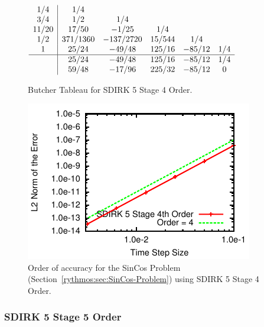 \begin{figure}[H]
\centering{}$\begin{array}{c|ccccc}
1/4 & 1/4\\
3/4 & 1/2 & 1/4\\
11/20 & 17/50 & -1/25 & 1/4\\
1/2 & 371/1360 & -137/2720 & 15/544 & 1/4\\
1 & 25/24 & -49/48 & 125/16 & -85/12 & 1/4\\
\hline  & 25/24 & -49/48 & 125/16 & -85/12 & 1/4\\
 & 59/48 & -17/96 & 225/32 & -85/12 & 0
\end{array}$\caption{Butcher Tableau for SDIRK 5 Stage 4 Order.}
\end{figure}
\begin{figure}[H]
\centering{}\includegraphics[scale=1.5]{figures/SDIRK_5Stage4Order}\caption{Order of accuracy for the SinCos Problem (Section~\ref{rythmos:sec:SinCos-Problem})
using SDIRK 5 Stage 4 Order.}
\end{figure}



\subsubsection{SDIRK 5 Stage 5 Order}

